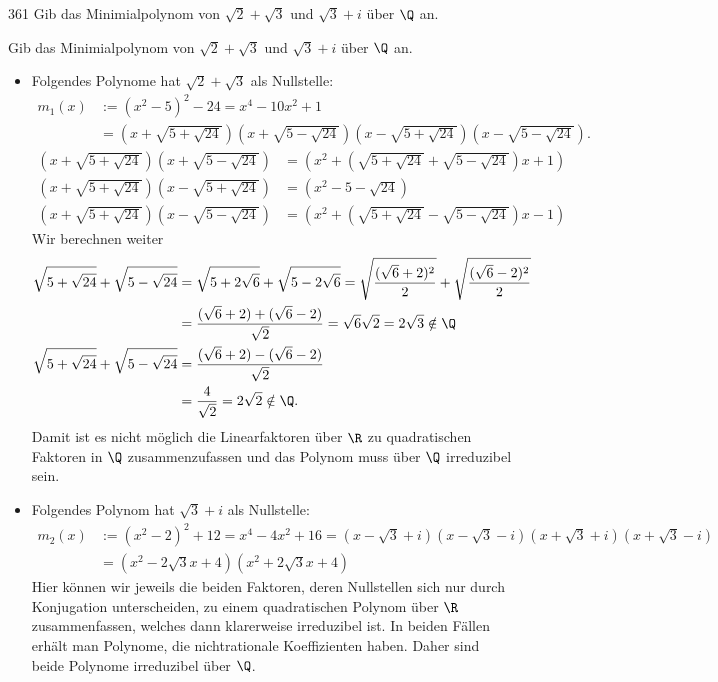 \begin{algebraUE}{361}
Gib das Minimialpolynom von $\sqrt{2} + \sqrt{3}$ und $\sqrt{3} + i$ über $\Q$ an.
\end{algebraUE}

\begin{solution}
  Gib das Minimialpolynom von $\sqrt{2} + \sqrt{3}$ und $\sqrt{3} + i$ über $\Q$ an.

  \begin{itemize}
  \item Folgendes Polynome hat $\sqrt{2} + \sqrt{3}$ als Nullstelle:
  \begin{align*}
    m_1(x) &:= (x^2 - 5)^2 - 24 = x^4 - 10x^2 + 1 \\
    &= \left(x + \sqrt{5+\sqrt{24}}\right)\left(x + \sqrt{5-\sqrt{24}}\right)
    \left(x - \sqrt{5+\sqrt{24}}\right)\left(x - \sqrt{5-\sqrt{24}}\right).
  \end{align*}
  \begin{align*}
    \left(x + \sqrt{5+\sqrt{24}}\right)\left(x + \sqrt{5-\sqrt{24}}\right) &= \left(x^2 + \left(\sqrt{5+\sqrt{24}} + \sqrt{5-\sqrt{24}}\right)x + 1\right) \\
    \left(x + \sqrt{5+\sqrt{24}}\right)\left(x - \sqrt{5+\sqrt{24}}\right) &= \left(x^2 - 5 - \sqrt{24}\right) \\
    \left(x + \sqrt{5+\sqrt{24}}\right)\left(x - \sqrt{5-\sqrt{24}}\right) &= \left(x^2 + \left(\sqrt{5+\sqrt{24}} - \sqrt{5-\sqrt{24}}\right)x - 1\right)
  \end{align*}
  Wir berechnen weiter
  \begin{align*}
     \sqrt{5+\sqrt{24}} + \sqrt{5-\sqrt{24}} &= \sqrt{5+2\sqrt{6}} + \sqrt{5-2\sqrt{6}}
     = \sqrt{\frac{(\sqrt{6}+2)^2}{2}} + \sqrt{\frac{(\sqrt{6}-2)^2}{2}} \\
     &= \frac{(\sqrt{6}+2) + (\sqrt{6}-2)}{\sqrt{2}} = \sqrt{6}\sqrt{2} = 2\sqrt{3} \notin \Q\\
     \sqrt{5+\sqrt{24}} + \sqrt{5-\sqrt{24}} &= \frac{(\sqrt{6}+2) - (\sqrt{6}-2)}{\sqrt{2}} \\
     &= \frac{4}{\sqrt{2}} = 2\sqrt{2} \notin \Q.
  \end{align*}
  Damit ist es nicht möglich die Linearfaktoren über $\R$ zu quadratischen Faktoren in $\Q$
  zusammenzufassen und das Polynom muss über $\Q$ irreduzibel sein.
  \item Folgendes Polynom hat $\sqrt{3} + i$ als Nullstelle:
  \begin{align*}
    m_2(x) &:= (x^2 -2)^2 + 12 = x^4 - 4x^2 + 16 = (x - \sqrt{3} + i)(x - \sqrt{3} - i)(x + \sqrt{3} + i)(x + \sqrt{3} - i) \\
    &= \left(x^2 - 2\sqrt{3}x + 4\right)\left(x^2 + 2\sqrt{3}x + 4\right)
  \end{align*}
  Hier können wir jeweils die beiden Faktoren, deren Nullstellen sich nur durch Konjugation unterscheiden, zu einem quadratischen Polynom über $\R$ zusammenfassen, welches dann klarerweise irreduzibel ist. In beiden Fällen erhält man Polynome, die nichtrationale Koeffizienten haben. Daher sind beide Polynome irreduzibel über $\Q$.
  \end{itemize}
\end{solution}
